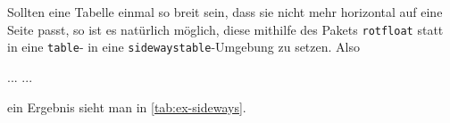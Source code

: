 Sollten eine Tabelle einmal so breit sein, dass sie nicht mehr horizontal auf
eine Seite passt, so ist es natürlich möglich, diese mithilfe des Pakets
\texttt{rotfloat} \parencite{Sommerfeldt2004} statt in eine \texttt{table}- in eine
\texttt{sidewaystable}-Umgebung zu setzen. Also
\begin{latex}[caption={Gedrehte Tabelle},label={lst:rotated-table}]
\begin{table}
  \centering
  \begin{tabular}{...}
    ...
  \end{tabular}
  \caption{Bezeichnung}
  \label{Referenzmarke}
\end{table}
\end{latex}
ein Ergebnis sieht man in \cref{tab:ex-sideways}.
\newenvironment{tabitemize}{%
\begin{list}{\textbullet}{%
\setlength\topsep{0pt}%
\setlength\parsep{0pt}%
\setlength\itemsep{0pt}%
\setlength\leftmargin{0em}%
\setlength\leftmargin{1em}%
\setlength\labelwidth{0.5em}%
\setlength\labelsep{0.5em}%
}
}{%
\end{list}
}

